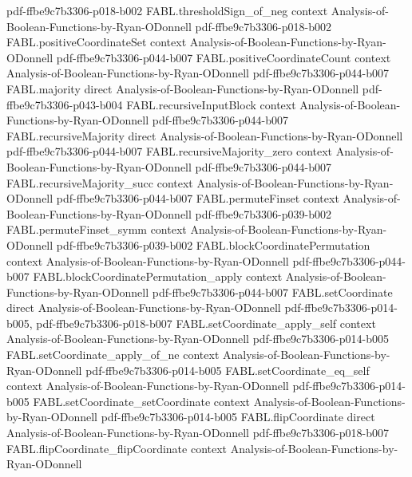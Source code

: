 \begin{theorem}
  {pdf-ffbe9c7b3306-p018-b002}
\proofstep
  {FABL.thresholdSign_of_neg}
  {context}
  {Analysis-of-Boolean-Functions-by-Ryan-ODonnell}
  {pdf-ffbe9c7b3306-p018-b002}
\proofstep
  {FABL.positiveCoordinateSet}
  {context}
  {Analysis-of-Boolean-Functions-by-Ryan-ODonnell}
  {pdf-ffbe9c7b3306-p044-b007}
\proofstep
  {FABL.positiveCoordinateCount}
  {context}
  {Analysis-of-Boolean-Functions-by-Ryan-ODonnell}
  {pdf-ffbe9c7b3306-p044-b007}
\proofstep
  {FABL.majority}
  {direct}
  {Analysis-of-Boolean-Functions-by-Ryan-ODonnell}
  {pdf-ffbe9c7b3306-p043-b004}
\proofstep
  {FABL.recursiveInputBlock}
  {context}
  {Analysis-of-Boolean-Functions-by-Ryan-ODonnell}
  {pdf-ffbe9c7b3306-p044-b007}
\proofstep
  {FABL.recursiveMajority}
  {direct}
  {Analysis-of-Boolean-Functions-by-Ryan-ODonnell}
  {pdf-ffbe9c7b3306-p044-b007}
\proofstep
  {FABL.recursiveMajority_zero}
  {context}
  {Analysis-of-Boolean-Functions-by-Ryan-ODonnell}
  {pdf-ffbe9c7b3306-p044-b007}
\proofstep
  {FABL.recursiveMajority_succ}
  {context}
  {Analysis-of-Boolean-Functions-by-Ryan-ODonnell}
  {pdf-ffbe9c7b3306-p044-b007}
\proofstep
  {FABL.permuteFinset}
  {context}
  {Analysis-of-Boolean-Functions-by-Ryan-ODonnell}
  {pdf-ffbe9c7b3306-p039-b002}
\proofstep
  {FABL.permuteFinset_symm}
  {context}
  {Analysis-of-Boolean-Functions-by-Ryan-ODonnell}
  {pdf-ffbe9c7b3306-p039-b002}
\proofstep
  {FABL.blockCoordinatePermutation}
  {context}
  {Analysis-of-Boolean-Functions-by-Ryan-ODonnell}
  {pdf-ffbe9c7b3306-p044-b007}
\proofstep
  {FABL.blockCoordinatePermutation_apply}
  {context}
  {Analysis-of-Boolean-Functions-by-Ryan-ODonnell}
  {pdf-ffbe9c7b3306-p044-b007}
\proofstep
  {FABL.setCoordinate}
  {direct}
  {Analysis-of-Boolean-Functions-by-Ryan-ODonnell}
  {pdf-ffbe9c7b3306-p014-b005,
    pdf-ffbe9c7b3306-p018-b007}
\proofstep
  {FABL.setCoordinate_apply_self}
  {context}
  {Analysis-of-Boolean-Functions-by-Ryan-ODonnell}
  {pdf-ffbe9c7b3306-p014-b005}
\proofstep
  {FABL.setCoordinate_apply_of_ne}
  {context}
  {Analysis-of-Boolean-Functions-by-Ryan-ODonnell}
  {pdf-ffbe9c7b3306-p014-b005}
\proofstep
  {FABL.setCoordinate_eq_self}
  {context}
  {Analysis-of-Boolean-Functions-by-Ryan-ODonnell}
  {pdf-ffbe9c7b3306-p014-b005}
\proofstep
  {FABL.setCoordinate_setCoordinate}
  {context}
  {Analysis-of-Boolean-Functions-by-Ryan-ODonnell}
  {pdf-ffbe9c7b3306-p014-b005}
\proofstep
  {FABL.flipCoordinate}
  {direct}
  {Analysis-of-Boolean-Functions-by-Ryan-ODonnell}
  {pdf-ffbe9c7b3306-p018-b007}
\proofstep
  {FABL.flipCoordinate_flipCoordinate}
  {context}
  {Analysis-of-Boolean-Functions-by-Ryan-ODonnell}

\end{theorem}
